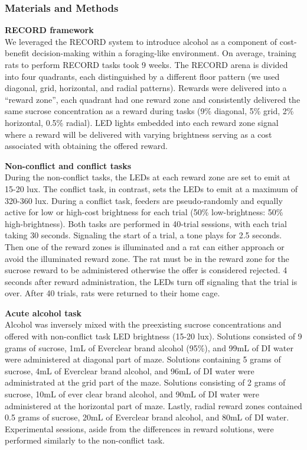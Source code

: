 \documentclass{article}
\begin{document}
\clearpage

\subsubsection{Materials and Methods}
\textbf{RECORD framework}\\
We leveraged the RECORD system to introduce alcohol as a component of cost-benefit decision-making within a foraging-like environment\cite{ibanez2024record}. On average, training rats to perform RECORD tasks took 9 weeks. The RECORD arena is divided into four quadrants, each distinguished by a different floor pattern (we used diagonal, grid, horizontal, and radial patterns). Rewards were delivered into a “reward zone”, each quadrant had one reward zone and consistently delivered the same sucrose concentration as a reward during tasks (9\% diagonal, 5\% grid, 2\% horizontal, 0.5\% radial). LED lights embedded into each reward zone signal where a reward will be delivered with varying brightness serving as a cost associated with obtaining the offered reward.

\vspace{1em}

\noindent\textbf{Non-conflict and conflict tasks}\\
During the non-conflict tasks, the LEDs at each reward zone are set to emit at 15-20 lux. The conflict task, in contrast, sets the LEDs to emit at a maximum of 320-360 lux. During a conflict task, feeders are pseudo-randomly and equally active for low or high-cost brightness for each trial (50\% low-brightness: 50\% high-brightness). Both tasks are performed in 40-trial sessions, with each trial taking 30 seconds. Signaling the start of a trial, a tone plays for 2.5 seconds. Then one of the reward zones is illuminated and a rat can either approach or avoid the illuminated reward zone. The rat must be in the reward zone for the sucrose reward to be administered otherwise the offer is considered rejected. 4 seconds after reward administration, the LEDs turn off signaling that the trial is over. After 40 trials, rats were returned to their home cage. 

\vspace{1em}

\noindent\textbf{Acute alcohol task}\\
Alcohol was inversely mixed with the preexisting sucrose concentrations and offered with non-conflict task LED brightness (15-20 lux). Solutions consisted of 9 grams of sucrose, 1mL of Everclear brand alcohol (95\%), and 99mL of DI water were administered at diagonal part of maze. Solutions containing 5 grams of sucrose, 4mL of Everclear brand alcohol, and 96mL of DI water were administrated at the grid part of the maze. Solutions consisting of 2 grams of sucrose, 10mL of ever clear brand alcohol, and 90mL of DI water were administered at the horizontal part of maze. Lastly, radial reward zones contained 0.5 grams of sucrose, 20mL of Everclear brand alcohol, and 80mL of DI water\cite{ibanez2024record}. Experimental sessions, aside from the differences in reward solutions, were performed similarly to the non-conflict task.
\end{document}
